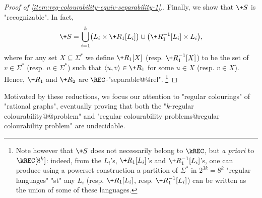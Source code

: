 \begin{proof}[Proof of \eqref{item:reg-colourability-equiv-separability-1}.]
    Finally, we show that $\+S$ is "recognizable". In fact, 
    \[
        \+S = \bigcup_{i=1}^k \bigl(
            L_i \times \+R_1[L_i]
        \bigr) \cup \bigl(
            \+R_1^{-1}[L_i] \times L_i
        \bigr),
    \] 
    where for any set $X \subseteq \Sigma^*$ we define $\+R_1[X]$ (resp. $\+R_1^{-1}[X]$)
    to be the set of $v\in \Sigma^*$ (resp. $u \in \Sigma^*$) such that
    $\tup{u,v} \in \+R_1$ for some $u \in X$ (resp. $v\in X$).
    Hence, $\+R_1$ and $\+R_2$ are $\REC$-"separable@@rel".%
    \footnote{%
        Note however that $\+S$ does not necessarily belong to $\kREC$,
        but \emph{a priori} to $\kREC[8^k]$: indeed, from the
        $L_i$'s, $\+R_1[L_i]$'s and $\+R_1^{-1}[L_i]$'s,
        one can produce using a powerset construction a partition of $\Sigma^*$
        in $2^{3k} = 8^k$ "regular languages" "st" any $L_i$ (resp. $\+R_1[L_i]$,
        resp. $\+R_1^{-1}[L_i]$) can be written as the union of some of these languages.
    }
\end{proof}

Motivated by these reductions, we focus our attention to "regular colourings" of "rational graphs",
eventually proving that both the "$k$-regular colourability@@problem" and
"regular colourability problems@regular colourability problem" are undecidable.
